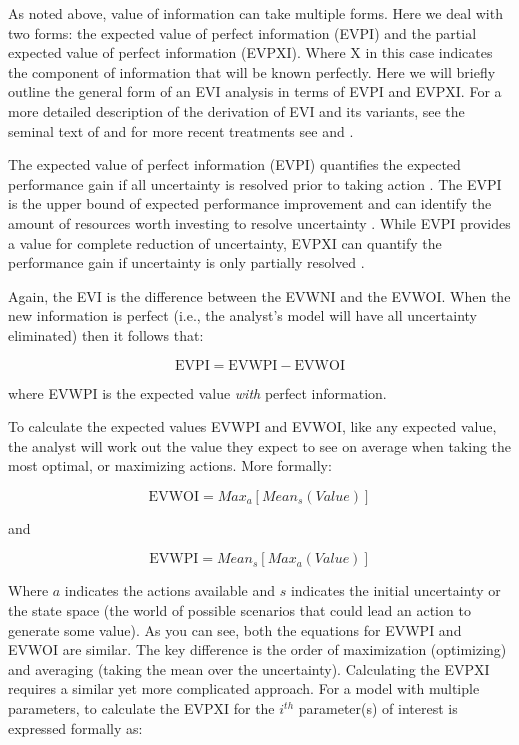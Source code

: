 \documentclass[draft]{article}
\theoremstyle{definition}
\theoremstyle{definition}
\theoremstyle{definition}
\theoremstyle{remark}
\begin{document}
As noted above, value of information can take multiple forms. Here we
deal with two forms: the expected value of perfect information (EVPI)
and the partial expected value of perfect information (EVPXI). Where X
in this case indicates the component of information that will be known
perfectly. Here we will briefly outline the general form of an EVI
analysis in terms of EVPI and EVPXI. For a more detailed description of
the derivation of EVI and its variants, see the seminal text of
\citet{Raiffa1961} and for more recent treatments see
\citet{Yokota2004a} and \citet{Williams2011}.

The expected value of perfect information (EVPI) quantifies the expected
performance gain if all uncertainty is resolved prior to taking action
\citep{Raiffa1961}. The EVPI is the upper bound of expected performance
improvement and can identify the amount of resources worth investing to
resolve uncertainty \citep{Runge2011a}. While EVPI provides a value for
complete reduction of uncertainty, EVPXI can quantify the performance
gain if uncertainty is only partially resolved \citep{Ades2004}.

Again, the EVI is the difference between the EVWNI and the EVWOI. When
the new information is perfect (i.e., the analyst's model will have all
uncertainty eliminated) then it follows that:

\begin{equation}
\mathrm{EVPI} = \mathrm{EVWPI} - \mathrm{EVWOI}
\label{eq:EVWOIch1}
\end{equation}

where EVWPI is the expected value \emph{with} perfect information.

To calculate the expected values EVWPI and EVWOI, like any expected
value, the analyst will work out the value they expect to see on average
when taking the most optimal, or maximizing actions. More formally:

\begin{equation}
\mathrm{EVWOI} = Max_{a}[Mean_{s}(Value)]
\label{eq:EVWOIch1}
\end{equation}

and

\begin{equation}
\mathrm{EVWPI} = Mean_{s}[Max_{a}(Value)]
\label{eq:EVWPIch1}
\end{equation}

Where \(a\) indicates the actions available and \(s\) indicates the
initial uncertainty or the state space (the world of possible scenarios
that could lead an action to generate some value). As you can see, both
the equations for EVWPI and EVWOI are similar. The key difference is the
order of maximization (optimizing) and averaging (taking the mean over
the uncertainty). Calculating the EVPXI requires a similar yet more
complicated approach. For a model with multiple parameters, to calculate
the EVPXI for the \(i^{th}\) parameter(s) of interest is expressed
formally as:
\end{document}
